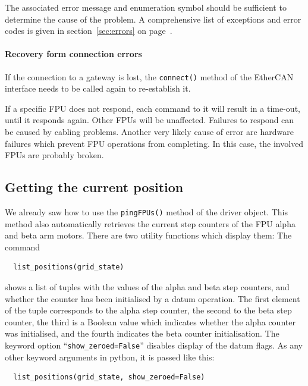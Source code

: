 \documentclass[11pt,a4paper]{scrartcl}
\begin{document}
The associated error message and enumeration symbol should be
sufficient to determine the cause of the problem. A comprehensive list
of exceptions and error codes is given in section~\ref{sec:errors} on
page~\pageref{sec:errors}.

\paragraph{Recovery form connection errors}
If the connection to a gateway is lost, the \texttt{connect()} method
of the EtherCAN interface needs to be called again to re-establish it.

If a specific FPU does not respond, each command to it will result in
a time-out, until it responds again. Other FPUs will be unaffected.
Failures to respond can be caused by cabling problems. Another very
likely cause of error are hardware failures which prevent FPU
operations from completing. In this case, the involved FPUs are
probably broken.



\subsection{Getting the current position}
   We already saw how to use
the \texttt{pingFPUs()} method of the driver object. This method also
automatically retrieves the current step counters of the FPU alpha and
beta arm motors.  There are two utility functions which display them:
The command

\begin{verbatim}
  list_positions(grid_state)
\end{verbatim}

shows a list of tuples with the values of the alpha and beta step
counters, and whether the counter has been initialised by a datum
operation. The first element of the tuple corresponds to the alpha
step counter, the second to the beta step counter, the third is a
Boolean value which indicates whether the alpha counter was
initialised, and the fourth indicates the beta counter
initialisation. The keyword option ``\texttt{show\_zeroed=False}''
disables display of the datum flags.  As any other keyword arguments
in python, it is passed like this:

\begin{verbatim}
  list_positions(grid_state, show_zeroed=False)
\end{verbatim}
\end{document}
